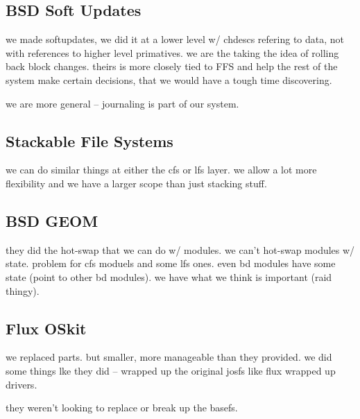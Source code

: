 \subsection{BSD Soft Updates}

we made softupdates, we did it at a lower level w/ chdescs refering to
data, not with references to higher level primatives. we are the
taking the idea of rolling back block changes. theirs is more closely
tied to FFS and help the rest of the system make certain decisions,
that we would have a tough time discovering.

we are more general -- journaling is part of our system.

\subsection{Stackable File Systems}

we can do similar things at either the cfs or lfs layer. we allow a
lot more flexibility and we have a larger scope than just stacking
stuff.

\subsection{BSD GEOM}

they did the hot-swap that we can do w/ modules. we can't hot-swap
modules w/ state. problem for cfs moduels and some lfs ones. even bd
modules have some state (point to other bd modules). we have what we
think is important (raid thingy).

\subsection{Flux OSkit}

we replaced parts. but smaller, more manageable than they provided. we
did some things lke they did -- wrapped up the original josfs like
flux wrapped up drivers.

they weren't looking to replace or break up the basefs.
